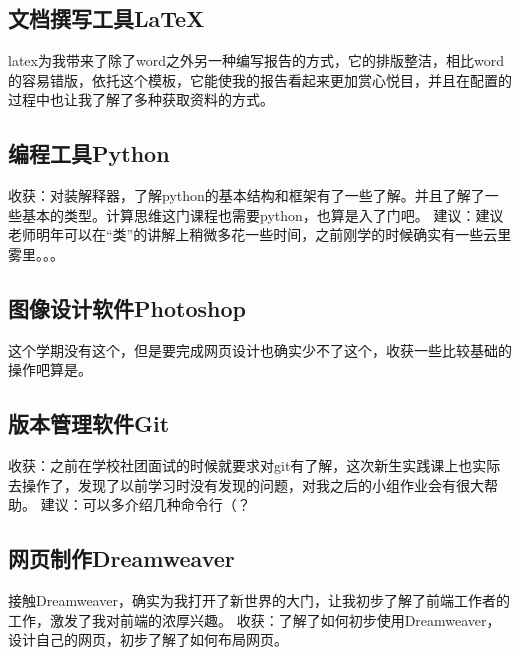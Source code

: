 \documentclass[supercite]{Experimental_Report}
\theoremstyle{definition}
\begin{document}
\subsection{文档撰写工具LaTeX}

latex为我带来了除了word之外另一种编写报告的方式，它的排版整洁，相比word的容易错版，依托这个模板，它能使我的报告看起来更加赏心悦目，并且在配置的过程中也让我了解了多种获取资料的方式。


\subsection{编程工具Python}

收获：对装解释器，了解python的基本结构和框架有了一些了解。并且了解了一些基本的类型。计算思维这门课程也需要python，也算是入了门吧。
建议：建议老师明年可以在“类”的讲解上稍微多花一些时间，之前刚学的时候确实有一些云里雾里。。。

\subsection{图像设计软件Photoshop}

这个学期没有这个，但是要完成网页设计也确实少不了这个，收获一些比较基础的操作吧算是。

\subsection{版本管理软件Git}

收获：之前在学校社团面试的时候就要求对git有了解，这次新生实践课上也实际去操作了，发现了以前学习时没有发现的问题，对我之后的小组作业会有很大帮助。
建议：可以多介绍几种命令行（？

\subsection{网页制作Dreamweaver}

接触Dreamweaver，确实为我打开了新世界的大门，让我初步了解了前端工作者的工作，激发了我对前端的浓厚兴趣。
收获：了解了如何初步使用Dreamweaver，设计自己的网页，初步了解了如何布局网页。


%
%

\end{document}
